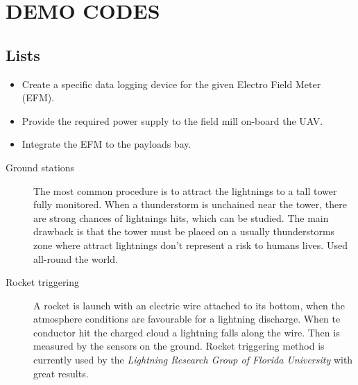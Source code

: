 \chapter{DEMO CODES}

\section{Lists}
\begin{itemize}
	\item Create a specific data logging device for the given Electro Field Meter (EFM).
	\item Provide the required power supply to the field mill on-board the UAV. 
	\item Integrate the EFM to the payloads bay.

\end{itemize}

 \begin{description}
	\item[Ground stations] The most common procedure is to attract the lightnings to a tall tower fully monitored. When a thunderstorm is unchained near the tower, there are strong chances of lightnings hits, which can be studied. The main drawback is that the tower must be placed on a usually thunderstorms zone where attract lightnings don't represent a risk to humans lives. Used all-round the world.  
	\item[Rocket triggering] A rocket is launch with an electric wire attached to its bottom, when the atmosphere conditions are favourable for a lightning discharge. When te conductor hit the  charged cloud a lightning falls along the wire. Then is measured by the sensors on the ground. Rocket triggering method is currently used by the \textit{Lightning Research Group of Florida University} with great results.

\end{description}

